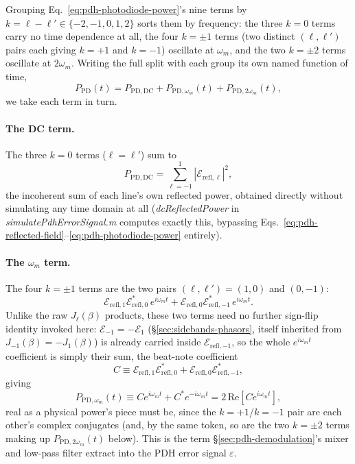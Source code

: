 \documentclass[9pt]{article}
\begin{document}
Grouping Eq.~\eqref{eq:pdh-photodiode-power}'s nine terms by
$k=\ell-\ell'\in\{-2,-1,0,1,2\}$ sorts them by frequency: the three $k=0$
terms carry no time dependence at all, the four $k=\pm1$ terms (two
distinct $(\ell,\ell')$ pairs each giving $k=+1$ and $k=-1$) oscillate at
$\omega_m$, and the two $k=\pm2$ terms oscillate at $2\omega_m$. Writing the
full split with each group its own named function of time,
\begin{equation}
P_{\mathrm{PD}}(t) = P_{\mathrm{PD,DC}} + P_{\mathrm{PD},\omega_m}(t) + P_{\mathrm{PD},2\omega_m}(t),
\label{eq:pdh-pd-split}
\end{equation}
we take each term in turn.

\paragraph{The DC term.} The three $k=0$ terms ($\ell=\ell'$) sum to
\begin{equation}
P_{\mathrm{PD,DC}} = \sum_{\ell=-1}^{1} \left|\mathcal{E}_{\mathrm{refl},\ell}\right|^2,
\label{eq:pdh-pdc}
\end{equation}
the incoherent sum of each line's own reflected power, obtained directly
without simulating any time domain at all (\textit{dcReflectedPower} in
\textit{simulatePdhErrorSignal.m} computes exactly this, bypassing
Eqs.~\eqref{eq:pdh-reflected-field}--\eqref{eq:pdh-photodiode-power}
entirely).

\paragraph{The $\omega_m$ term.} The four $k=\pm1$ terms are the two pairs
$(\ell,\ell')=(1,0)$ and $(0,-1)$:
\[
\mathcal{E}_{\mathrm{refl},1}\mathcal{E}_{\mathrm{refl},0}^*\,e^{i\omega_m t}
+ \mathcal{E}_{\mathrm{refl},0}\mathcal{E}_{\mathrm{refl},-1}^*\,e^{i\omega_m t}.
\]
Unlike the raw $J_\ell(\beta)$ products, these two terms need no further
sign-flip identity invoked here: $\mathcal{E}_{-1}=-\mathcal{E}_1$
(\S\ref{sec:sidebands-phasors}, itself inherited from
$J_{-1}(\beta)=-J_1(\beta)$) is already carried inside
$\mathcal{E}_{\mathrm{refl},-1}$, so the whole $e^{i\omega_m t}$ coefficient
is simply their sum, the beat-note coefficient
\begin{equation}
C \equiv \mathcal{E}_{\mathrm{refl},1}\mathcal{E}_{\mathrm{refl},0}^* + \mathcal{E}_{\mathrm{refl},0}\mathcal{E}_{\mathrm{refl},-1}^*,
\label{eq:pdh-beat-coefficient}
\end{equation}
giving
\begin{equation}
P_{\mathrm{PD},\omega_m}(t) \equiv Ce^{i\omega_m t}+C^*e^{-i\omega_m t} = 2\,\mathrm{Re}\!\left[Ce^{i\omega_m t}\right],
\label{eq:pdh-pd-omega-term}
\end{equation}
real as a physical power's piece must be, since the $k=+1$/$k=-1$ pair are
each other's complex conjugates (and, by the same token, so are the two
$k=\pm2$ terms making up $P_{\mathrm{PD},2\omega_m}(t)$ below). This is
the term \S\ref{sec:pdh-demodulation}'s mixer and low-pass filter extract
into the PDH error signal $\varepsilon$.
\end{document}

